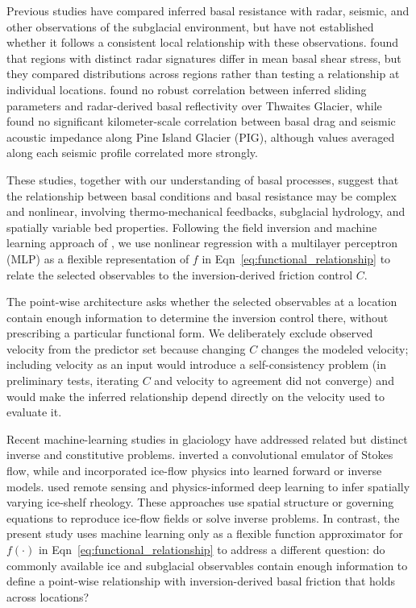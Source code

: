 \documentclass[review,jog]{igs}
\begin{document}
Previous studies have compared inferred basal resistance with radar, seismic, and other observations of the subglacial environment, but have not established whether it follows a consistent local relationship with these observations. \citet{haris2024can} found that regions with distinct radar signatures differ in mean basal shear stress, but they compared distributions across regions rather than testing a relationship at individual locations.
\citet{das2023quest} found no robust correlation between inferred sliding
parameters and radar-derived basal reflectivity over Thwaites Glacier, while
\citet{kyrke2017can} found no significant kilometer-scale correlation between basal
drag and seismic acoustic impedance along Pine Island Glacier (PIG), although
values averaged along each seismic profile correlated more strongly.

These studies, together with our understanding of basal processes, suggest that the relationship between basal conditions and basal resistance may be complex and nonlinear, involving thermo-mechanical feedbacks, subglacial hydrology, and spatially variable bed properties. Following the field inversion and machine learning approach of \citet{parish2016paradigm}, we use nonlinear regression with a multilayer perceptron (MLP) as a flexible representation of $f$ in Eqn~\ref{eq:functional_relationship} to relate the selected observables to the inversion-derived friction control $C$.

 The point-wise architecture asks whether the selected observables at a location contain enough information to determine the inversion control there, without prescribing a particular functional form. We deliberately exclude observed velocity from the predictor set because changing $C$ changes the modeled velocity; including velocity as an input would introduce a self-consistency problem (in preliminary tests, iterating $C$ and velocity to agreement did not converge) and would make the inferred relationship depend directly on the velocity used to evaluate it.

Recent machine-learning studies in glaciology have addressed related but distinct inverse and constitutive problems. \citet{jouvet2023inversion} inverted a convolutional emulator of Stokes flow, while \citet{jouvet2023ice} and \citet{cheng2024forward} incorporated ice-flow physics into learned forward or inverse models. \citet{wang2025deep} used remote sensing and physics-informed deep learning to infer spatially varying ice-shelf rheology. These approaches use spatial structure or governing equations to reproduce ice-flow fields or solve inverse problems. In contrast, the present study uses machine learning only as a flexible function approximator for $f(\cdot)$ in Eqn~\ref{eq:functional_relationship} to address a different question: do commonly available ice and subglacial observables contain enough information to define a point-wise relationship with inversion-derived basal friction that holds across locations?
\end{document}
